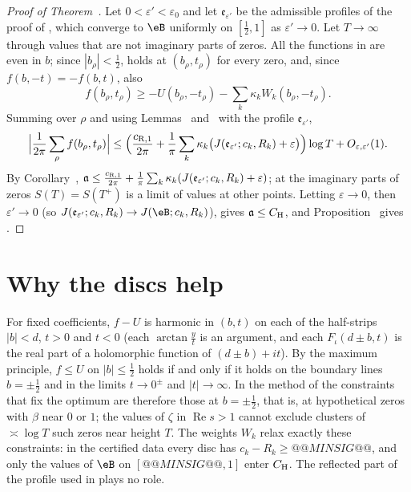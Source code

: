 \begin{proof}[Proof of Theorem~]
Let $0<\varepsilon'<\varepsilon_0$ and let $\mathfrak e_{\varepsilon'}$ be the admissible profiles of the proof of \cite[Cor.~1.2]{CasanaGiner2026}, which converge to $\eB$ uniformly on $[\frac12,1]$ as $\varepsilon'\to0$. Let $T\to\infty$ through values that are not imaginary parts of zeros. All the functions in  are even in $b$; since $|b_\rho|<\frac12$,  holds at $(b_\rho,t_\rho)$ for every zero, and, since $f(b,-t)=-f(b,t)$, also
\[
f(b_\rho,t_\rho)\ge-U(b_\rho,-t_\rho)-\sum_k\kappa_kW_k(b_\rho,-t_\rho).
\]
Summing over $\rho$ and using Lemmas~ and~ with the profile $\mathfrak e_{\varepsilon'}$,
\[
\Bigl|\frac1{2\pi}\sum_\rho f(b_\rho,t_\rho)\Bigr|\le\Bigl(\frac{c_{{\rm R},1}}{2\pi}+\frac1\pi\sum_k\kappa_k\bigl(J(\mathfrak e_{\varepsilon'};c_k,R_k)+\varepsilon\bigr)\Bigr)\log T+O_{\varepsilon,\varepsilon'}(1).
\]
By Corollary~, $\mathfrak a\le\frac{c_{{\rm R},1}}{2\pi}+\frac1\pi\sum_k\kappa_k(J(\mathfrak e_{\varepsilon'};c_k,R_k)+\varepsilon)$; at the imaginary parts of zeros $S(T)=S(T^+)$ is a limit of values at other points. Letting $\varepsilon\to0$, then $\varepsilon'\to0$ (so $J(\mathfrak e_{\varepsilon'};c_k,R_k)\to J(\eB;c_k,R_k)$), gives $\mathfrak a\le C_{\rm H}$, and Proposition~ gives .
\end{proof}

\section{Why the discs help}\label{sec:why}

\begin{remark}\label{rem:binding}
For fixed coefficients, $f-U$ is harmonic in $(b,t)$ on each of the half-strips $|b|<d$, $t>0$ and $t<0$ (each $\arctan\frac{y}{t}$ is an argument, and each $F_\iota(d\pm b,t)$ is the real part of a holomorphic function of $(d\pm b)+it$). By the maximum principle, $f\le U$ on $|b|\le\frac12$ holds if and only if it holds on the boundary lines $b=\pm\frac12$ and in the limits $t\to0^\pm$ and $|t|\to\infty$. In the method of \cite{Amberger2025,BellottiWong2026} the constraints that fix the optimum are therefore those at $b=\pm\frac12$, that is, at hypothetical zeros with $\beta$ near $0$ or $1$; the values of $\zeta$ in $\operatorname{Re}s>1$ cannot exclude clusters of $\asymp\log T$ such zeros near height $T$. The weights $W_k$ relax exactly these constraints: in the certified data every disc has $c_k-R_k\ge@@MINSIG@@$, and only the values of $\eB$ on $[@@MINSIG@@,1]$ enter $C_{\rm H}$. The reflected part of the profile used in \cite{CasanaGiner2026} plays no role.
\end{remark}

